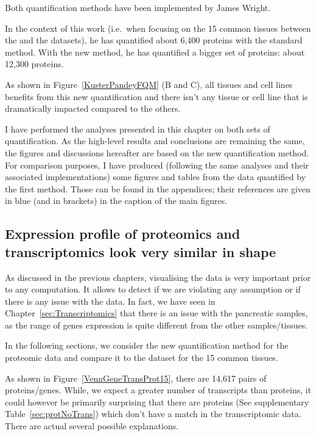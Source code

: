 Both quantification methods have been implemented by James Wright.

In the context of this work (i.e.\ when focusing on the 15 common tissues between
the  and the  datasets),
he has quantified about 6,400 proteins with
the standard method. With the new method, he has quantified a bigger set of
proteins: about 12,300 proteins.

As shown in Figure~\ref{KusterPandeyFQM} (B and C),
all tissues and cell lines benefits from this new quantification and there isn't
any tissue or cell line that is dramatically impacted compared to the others.

I have performed the analyses presented in this chapter on both sets of
quantification. As the high-level results and conclusions are remaining the same,
the figures and discussions hereafter are based on
the new quantification method. For comparison purposes,
I have produced (following the same analyses and their associated implementations)
some figures and tables from the data quantified by the first method.
Those can be found in the appendices; their references
are given in blue (and in brackets) in the caption of the main figures.



\subsection{Expression profile of proteomics and transcriptomics look very
similar in shape}
\label{sec:IntegrationExpProfileSim}

As discussed in the previous chapters, visualising the data is very important
prior to any computation. It allows to detect if we are violating
any assumption or if there is any issue with the data. In fact, we have seen in
Chapter~\ref{sec:Transcriptomics} that there is an issue with the pancreatic
samples, as the range of genes expression is quite different from the other
samples/tissues.

In the following sections, we consider the new quantification method for the
proteomic data and compare it to the  dataset for the
15 common tissues.

As shown in Figure~\ref{VennGeneTransProt15}, there are 14,617 pairs of
proteins/genes. While, we expect a greater number of transcripts than proteins,
it could however be primarily surprising that there are proteins
(See supplementary Table~\ref{sec:protNoTrans}) which don't have
a match in the transcriptomic data. There are actual several possible explanations.

